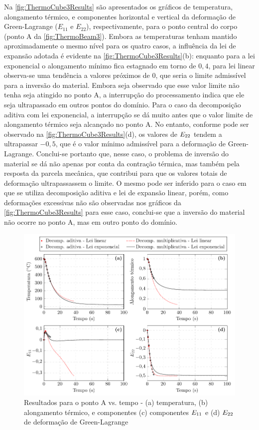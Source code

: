 \documentclass[Tese.tex]{subfiles}
\begin{document}
Na \autoref{fig:ThermoCube3Results} são apresentados os gráficos de temperatura, alongamento térmico, e componentes horizontal e vertical da deformação de Green-Lagrange ($E_{11}$ e $E_{22}$), respectivamente, para o ponto central do corpo (ponto A da \autoref{fig:ThermoBeam3}). Embora as temperaturas tenham mantido aproximadamente o mesmo nível para os quatro casos, a influência da lei de expansão adotada é evidente na \autoref{fig:ThermoCube3Results}(b): enquanto para a lei exponencial o alongamento mínimo fica estagnado em torno de $0,4$, para lei linear observa-se uma tendência a valores próximos de $0$, que seria o limite admissível para a inversão do material. Embora seja observado que esse valor limite não tenha seja atingido no ponto A, a interrupção do processamento indica que ele seja ultrapassado em outros pontos do domínio. Para o caso da decomposição aditiva com lei exponencial, a interrupção se dá muito antes que o valor limite de alongamento térmico seja alcançado no ponto A. No entanto, conforme pode ser observado na \autoref{fig:ThermoCube3Results}(d), os valores de ${E}_{22}$ tendem a ultrapassar $-0,5$, que é o valor mínimo admissível para a deformação de Green-Lagrange. Conclui-se portanto que, nesse caso, o problema de inversão do material se dá não apenas por conta da contração térmica, mas também pela resposta da parcela mecânica, que contribui para que os valores totais de deformação ultrapassassem o limite. O mesmo pode ser inferido para o caso em que se utiliza decomposição aditiva e lei de expansão linear, porém, como deformações excessivas não são observadas nos gráficos da \autoref{fig:ThermoCube3Results} para esse caso, conclui-se que a inversão do material não ocorre no ponto A, mas em outro ponto do domínio.

\begin{figure}[!htb]
	\centering
	\caption{Resultados para o ponto A vs. tempo - (a) temperatura, (b) alongamento térmico, e componentes (c) componentes ${E}_{11}$ e (d) ${E}_{22}$ de deformação de Green-Lagrange}
	\label{fig:ThermoCube3Results}
	\includegraphics[scale=1.08]{Figuras/ThermoCube3/ThermoCube3Results.pdf}
\end{figure}
\end{document}
